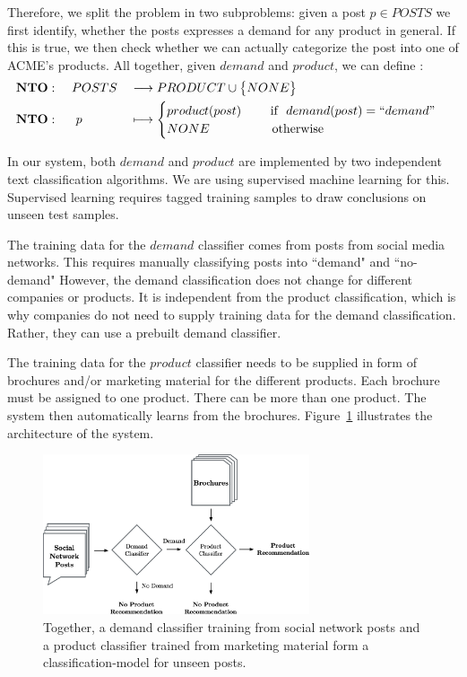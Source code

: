 Therefore, we split the \nto problem in two subproblems: given a post $p \in POSTS$ we first identify, whether the posts expresses a demand for any product in general.
If this is true, we then check whether we can actually categorize the post into one of ACME's products.
All together, given $demand$ and $product$, we can define \nto:
\begin{alignat*}{3}
  &\mathbf{NTO}: && ~POSTS && \longrightarrow PRODUCT \cup \big\{ NONE \big\} \\
  &\mathbf{NTO}: && ~~p   && \longmapsto \begin{cases}
	    product(post)~~~~~~~\text{if }~demand(post) = ``demand" \\
	    NONE~~~~~~~~~~~~~~~\text{otherwise}
   \end{cases}
\end{alignat*}

In our system, both $demand$ and $product$ are implemented by two independent text classification algorithms.
We are using supervised machine learning for this.
Supervised learning requires tagged training samples to draw conclusions on unseen test samples.

The training data for the $demand$ classifier comes from posts from social media networks.
This requires manually classifying posts into ``demand" and ``no-demand"
However, the demand classification does not change for different companies or products.
It is independent from the product classification, which is why companies do not need to supply training data for the demand classification.
Rather, they can use a prebuilt demand classifier.

The training data for the $product$ classifier needs to be supplied in form of brochures and/or marketing material for the different products.
Each brochure must be assigned to one product.
There can be more than one product.
The system then automatically learns from the brochures.
Figure~\ref{fig:workflow} illustrates the architecture of the system.

\begin{figure}
	\label{fig:workflow}
	\begin{center}
		\includegraphics[width=0.7\textwidth]{figures/nto_workflow.eps}
	\end{center}
	\caption{Together, a demand classifier training from social network posts and a product classifier trained from marketing material form a classification-model for unseen posts.}
\end{figure}

